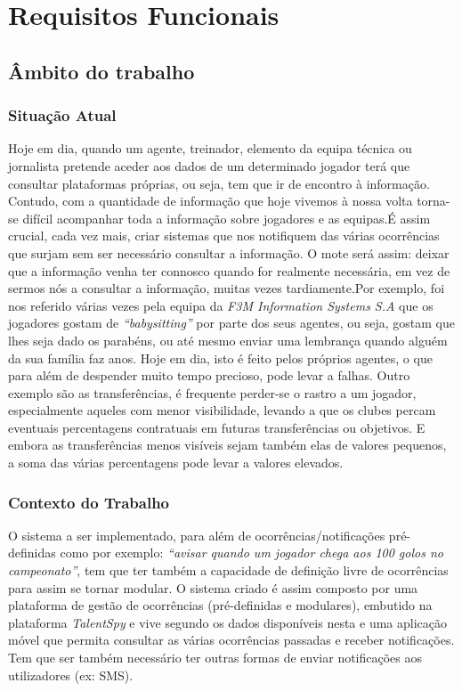 \chapter{Requisitos Funcionais}

\section{Âmbito do trabalho}

\subsection{Situação Atual}

Hoje em dia, quando um agente, treinador, elemento da equipa técnica ou jornalista pretende aceder aos dados de um determinado jogador terá que consultar plataformas próprias, ou seja, tem que ir de encontro à informação.
Contudo, com a quantidade de informação que hoje vivemos à nossa volta torna-se difícil acompanhar toda a informação sobre jogadores e as equipas.\newline É assim crucial, cada vez mais, criar sistemas que nos notifiquem das várias ocorrências que surjam sem ser necessário consultar a informação. O mote será assim: deixar que a informação venha ter connosco quando for realmente necessária, em vez de sermos nós a consultar a informação, muitas vezes tardiamente.\newline Por exemplo, foi nos referido várias vezes pela equipa da \emph{F3M Information Systems S.A} que os jogadores gostam de \emph{“babysitting”} por parte dos seus agentes, ou seja, gostam que lhes seja dado os parabéns, ou até mesmo enviar uma lembrança quando alguém da sua família faz anos. Hoje em dia, isto é feito pelos próprios agentes, o que para além de despender muito tempo precioso, pode levar a falhas.  Outro exemplo são as transferências, é frequente perder-se o rastro a um jogador, especialmente aqueles com menor visibilidade, levando a que os clubes percam eventuais percentagens contratuais em futuras transferências ou objetivos. E embora as transferências menos visíveis sejam também elas de valores pequenos, a soma das várias percentagens pode levar a valores elevados.

\subsection{Contexto do Trabalho}

O sistema a ser implementado, para além de ocorrências/notificações pré-definidas como por exemplo: \emph{“avisar quando um jogador chega aos 100 golos no campeonato”}, tem que ter também a capacidade de definição livre de ocorrências para assim se tornar modular. 
O sistema criado é assim composto por uma plataforma de gestão de ocorrências (pré-definidas e modulares), embutido na plataforma \emph{TalentSpy} e vive segundo os dados disponíveis nesta e uma aplicação móvel que permita consultar as várias ocorrências passadas e receber notificações. Tem que ser também necessário ter outras formas de enviar notificações aos utilizadores (ex: SMS).

